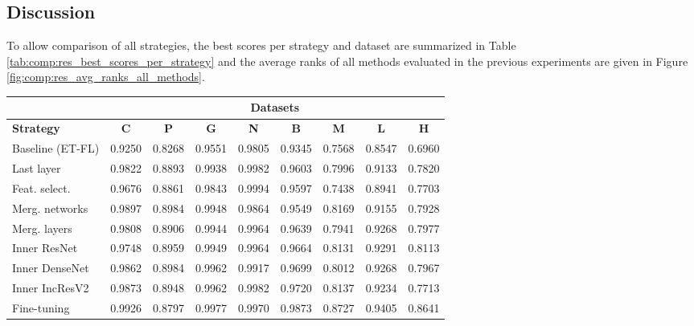 \subsection{Discussion}
\label{ssec:comp:exp_comparing}

To allow comparison of all strategies, the best scores per strategy and dataset are summarized in Table \ref{tab:comp:res_best_scores_per_strategy} and the average ranks of all methods evaluated in the previous experiments are given in Figure \ref{fig:comp:res_avg_ranks_all_methods}.

\begin{table}
    \center
    \small
    \begin{tabular}{|l||c|c|c|c|c||c|c|c|}   
      \hline 
      & \multicolumn{8}{c|}{\textbf{Datasets}} \\
      \hline 
      \textbf{Strategy} & \textbf{C} & \textbf{P} & \textbf{G} & \textbf{N} & \textbf{B} & \textbf{M} & \textbf{L} & \textbf{H} \\
      \hline
      Baseline (ET-FL)      & 0.9250 & 0.8268 & 0.9551 & 0.9805	& 0.9345 & 0.7568 & 0.8547 & 0.6960 \\
      Last layer    & 0.9822 & 0.8893 & 0.9938 & \cellcolor{Dandelion}0.9982 & 0.9603 & 0.7996 & 0.9133	& 0.7820 \\
      Feat. select.	& 0.9676	& 0.8861	& 0.9843	& \cellcolor{LimeGreen}0.9994	& 0.9597	& 0.7438	& 0.8941	& 0.7703 \\
      Merg. networks	& \cellcolor{Dandelion}0.9897	& \cellcolor{LimeGreen}0.8984	& 0.9948	& 0.9864	& 0.9549	& \cellcolor{Dandelion}0.8169	& 0.9155	& 0.7928 \\
      Merg. layers	& 0.9808	& 0.8906	& 0.9944	& 0.9964	& 0.9639	& 0.7941	& 0.9268	& 0.7977 \\
      Inner ResNet	& 0.9748	& \cellcolor{Dandelion}0.8959	& 0.9949	& 0.9964	& 0.9664	& 0.8131	& \cellcolor{Dandelion}0.9291	& \cellcolor{Dandelion}0.8113 \\
      Inner DenseNet	& 0.9862	& \cellcolor{LimeGreen}0.8984	& \cellcolor{Dandelion}0.9962	& 0.9917	& 0.9699	& 0.8012	& 0.9268	& 0.7967 \\
      Inner IncResV2	& 0.9873	& 0.8948	& \cellcolor{Dandelion}0.9962	& \cellcolor{Dandelion}0.9982	& \cellcolor{Dandelion}0.9720	& 0.8137	& 0.9234	& 0.7713 \\
       Fine-tuning		& \cellcolor{LimeGreen}0.9926	& 0.8797	& \cellcolor{LimeGreen}0.9977	& 0.9970	& \cellcolor{LimeGreen}0.9873	& \cellcolor{LimeGreen}0.8727	& \cellcolor{LimeGreen}0.9405	& \cellcolor{LimeGreen}0.8641 \\

\end{tabular}
\end{table}
